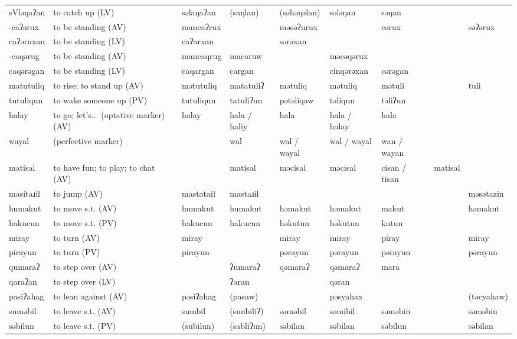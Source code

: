 \begin{landscape}
\begin{longtable}{*{9}{>{\raggedright\arraybackslash}p{}}}
\text{*}sVləŋaʔan & to catch up (LV) & səlaŋaʔan & (saŋlan) & (səhəŋəlan) & sələŋan & səŋan &  & \\
\text{*}-caʔərux & to be standing (AV) & mancaʔrux &  & məsəʔurux &  & cərux &  & səʔərux\\
\text{*}caʔəruxan & to be standing (LV) & caʔarxan &  & sərəxan &  &  &  & \\
\text{*}-caqərug & to be standing (AV) & mancaqrug & macaruw &  & məcəqərux &  &  & \\
\text{*}caqərəgan & to be standing (LV) & caqargan & cargan &  & cinqərəxan & cərəgan &  & \\
\text{*}matutuliq & to rise; to stand up (AV) & mətutuliq & matatuliʔ & mətuliq & mətuliq & mətuli &  & tuli\\
\text{*}tutuliqun & to wake someone up (PV) & tutuliqun & tatuliʔun & pətəliqaw & təliqun & təliʔun &  & \\
\text{*}halay & to go; let's... (optative marker) (AV) & halay & hala / haliy & hala & hala / halay & hala &  & \\
\text{*}wayal & (perfective marker) &  & wal & wal / wayal & wal / wayal & wan / wayan &  & \\
\text{*}matisal & to have fun; to play; to chat (AV) &  & matisal & məcisal & məcisal & cisan / tisan & matisal & \\
\text{*}masitaɹil & to jump (AV) & mastatail & mastaɹil &  &  &  &  & məsətazin\\
\text{*}humakut & to move s.t. (AV) & humakut & humakut & həmakut & həmakut & makut &  & həmakut\\
\text{*}hakucun & to move s.t. (PV) & hakucun & hakucun & həkutun & həkutun & kutun &  & \\
\text{*}miray & to turn (AV) & miray &  & miray & miray & piray &  & miray\\
\text{*}pirayun & to turn (PV) & pirayun &  & pərayun & pərayun & pərayun &  & pərayun\\
\text{*}qumaraʔ & to step over (AV) &  & ʔumaraʔ & qəmaraʔ & qəmaraʔ & mara &  & \\
\text{*}qaraʔan & to step over (LV) &  & ʔaran &  & qəran &  &  & \\
\text{*}pasiʔahag & to lean against (AV) & pəsiʔahag & (pasaw) &  & pəsyahax &  &  & (təcyahaw)\\
\text{*}suməbil & to leave s.t. (AV) & sumbil & (sunbiliʔ) & səməbil & səmibil & səməbin &  & səməbin\\
\text{*}səbilun & to leave s.t. (PV) & (subilun) & (sabliʔun) & səbilan & səbilan & səbilun &  & səbilan\\

\end{longtable}
\end{landscape}
